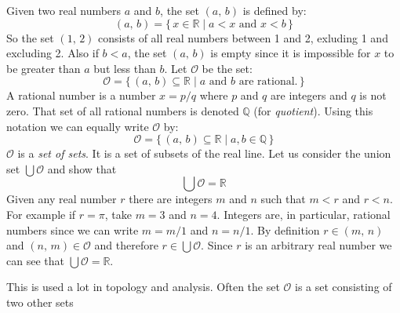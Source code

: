             \begin{example}
                Given two real numbers $a$ and $b$, the set $(a,\,b)$ is defined
                by:
                \begin{equation}
                    (a,\,b)=\{\,x\in\mathbb{R}\;|\;a<x\textrm{ and }x<b\,\}
                \end{equation}
                So the set $(1,\,2)$ consists of all real numbers between 1 and
                2, exluding 1 and excluding 2. Also if $b<a$, the set
                $(a,\,b)$ is empty since it is impossible for
                $x$ to be greater than $a$ but less than $b$.
                Let $\mathcal{O}$ be the set:
                \begin{equation}
                    \mathcal{O}=\{\,(a,\,b)\subseteq\mathbb{R}\;|\;
                        a\textrm{ and }b\textrm{ are rational.}\,\}
                \end{equation}
                A rational number is a number $x=p/q$ where $p$ and $q$ are
                integers and $q$ is not zero. That set of all rational numbers
                is denoted $\mathbb{Q}$ (for \textit{quotient}). Using this
                notation we can equally write $\mathcal{O}$ by:
                \begin{equation}
                    \mathcal{O}=\{\,(a,\,b)\subseteq\mathbb{R}
                        \;|\;a,b\in\mathbb{Q}\,\}
                \end{equation}
                $\mathcal{O}$ is a \textit{set of sets}. It is a set of subsets
                of the real line. Let us consider the union set
                $\bigcup\mathcal{O}$ and show that
                \begin{equation}
                    \bigcup\mathcal{O}=\mathbb{R}
                \end{equation}
                Given any real number $r$ there are integers $m$ and $n$
                such that $m<r$ and $r<n$. For example if $r=\pi$, take
                $m=3$ and $n=4$. Integers are, in particular, rational numbers
                since we can write $m=m/1$ and $n=n/1$. By definition
                $r\in(m,\,n)$ and $(n,\,m)\in\mathcal{O}$ and therefore
                $r\in\bigcup\mathcal{O}$. Since $r$ is an arbitrary real number
                we can see that $\bigcup\mathcal{O}=\mathbb{R}$.
            \end{example}
            This is used a lot in topology and analysis. Often the set
            $\mathcal{O}$ is a set consisting of two other sets
